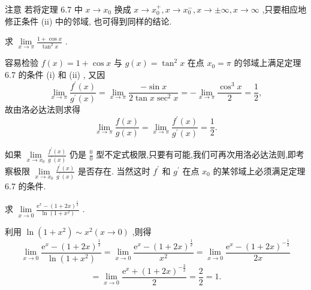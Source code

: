 注意 若将定理 6.7 中 \(x \rightarrow  {x}_{0}\) 换成 \(x \rightarrow  {x}_{0}^{ + },x \rightarrow  {x}_{0}^{ - },x \rightarrow   \pm  \infty ,x \rightarrow  \infty\) ,只要相应地修正条件 (ii) 中的邻域, 也可得到同样的结论.

\begin{example}
求 \(\mathop{\lim }\limits_{{x \rightarrow  \pi }}\frac{1 + \cos x}{{\tan }^{2}x}\) .
\end{example}


\begin{solution}
容易检验 \(f\left( x\right)  = 1 + \cos x\) 与 \(g\left( x\right)  = {\tan }^{2}x\) 在点 \({x}_{0} = \pi\) 的邻域上满足定理 6.7 的条件 (i) 和 (ii) , 又因
\[
\mathop{\lim }\limits_{{x \rightarrow  \pi }}\frac{{f}^{\prime }\left( x\right) }{{g}^{\prime }\left( x\right) } = \mathop{\lim }\limits_{{x \rightarrow  \pi }}\frac{-\sin x}{2\tan x{\sec }^{2}x} =  - \mathop{\lim }\limits_{{x \rightarrow  \pi }}\frac{{\cos }^{3}x}{2} = \frac{1}{2},
\]
故由洛必达法则求得
\[
\mathop{\lim }\limits_{{x \rightarrow  \pi }}\frac{f\left( x\right) }{g\left( x\right) } = \mathop{\lim }\limits_{{x \rightarrow  \pi }}\frac{{f}^{\prime }\left( x\right) }{{g}^{\prime }\left( x\right) } = \frac{1}{2}.
\]
\end{solution}

如果 \(\mathop{\lim }\limits_{{x \rightarrow  {x}_{0}}}\frac{{f}^{\prime }\left( x\right) }{{g}^{\prime }\left( x\right) }\) 仍是 \(\frac{0}{0}\) 型不定式极限,只要有可能,我们可再次用洛必达法则,即考察极限 \(\mathop{\lim }\limits_{{x \rightarrow  {x}_{0}}}\frac{{f}^{\prime }\left( x\right) }{{g}^{\prime }\left( x\right) }\) 是否存在. 当然这时 \({f}^{\prime }\) 和 \({g}^{\prime }\) 在点 \({x}_{0}\) 的某邻域上必须满足定理 6.7 的条件.

\begin{example}
求 \(\mathop{\lim }\limits_{{x \rightarrow  0}}\frac{{\mathrm{e}}^{x} - {\left( 1 + 2x\right) }^{\frac{1}{2}}}{\ln \left( {1 + {x}^{2}}\right) }\) .
\end{example}


\begin{solution}
利用 \(\ln \left( {1 + {x}^{2}}\right)  \sim  {x}^{2}\left( {x \rightarrow  0}\right)\) ,则得
\[
\mathop{\lim }\limits_{{x \rightarrow  0}}\frac{{\mathrm{e}}^{x} - {\left( 1 + 2x\right) }^{\frac{1}{2}}}{\ln \left( {1 + {x}^{2}}\right) } = \mathop{\lim }\limits_{{x \rightarrow  0}}\frac{{\mathrm{e}}^{x} - {\left( 1 + 2x\right) }^{\frac{1}{2}}}{{x}^{2}} = \mathop{\lim }\limits_{{x \rightarrow  0}}\frac{{\mathrm{e}}^{x} - {\left( 1 + 2x\right) }^{-\frac{1}{2}}}{2x}
\]
\[
= \mathop{\lim }\limits_{{x \rightarrow  0}}\frac{{\mathrm{e}}^{x} + {\left( 1 + 2x\right) }^{-\frac{3}{2}}}{2} = \frac{2}{2} = 1.
\]
\end{solution}


